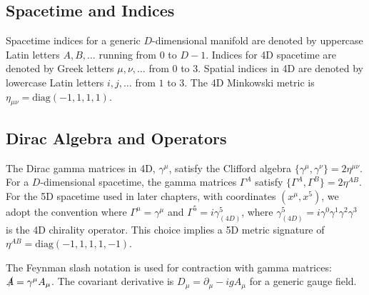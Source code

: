 \documentclass[11pt, letterpaper]{report}
\theoremstyle{plain} %
\theoremstyle{definition} %
\theoremstyle{remark} %
\begin{document}
\subsection{Spacetime and Indices}
Spacetime indices for a generic $D$-dimensional manifold are denoted by uppercase Latin letters $A, B, \dots$ running from $0$ to $D-1$. Indices for 4D spacetime are denoted by Greek letters $\mu, \nu, \dots$ from $0$ to $3$. Spatial indices in 4D are denoted by lowercase Latin letters $i, j, \dots$ from $1$ to $3$. The 4D Minkowski metric is $\eta_{\mu\nu} = \text{diag}(-1,1,1,1)$.

\subsection{Dirac Algebra and Operators}
The Dirac gamma matrices in 4D, $\gamma^\mu$, satisfy the Clifford algebra $\{\gamma^\mu, \gamma^\nu\} = 2\eta^{\mu\nu}$. For a $D$-dimensional spacetime, the gamma matrices $\Gamma^A$ satisfy $\{\Gamma^A, \Gamma^B\} = 2\eta^{AB}$. For the 5D spacetime used in later chapters, with coordinates $(x^\mu, x^5)$, we adopt the convention where $\Gamma^\mu = \gamma^\mu$ and $\Gamma^5 = i\gamma^5_{(4D)}$, where $\gamma^5_{(4D)} = i\gamma^0\gamma^1\gamma^2\gamma^3$ is the 4D chirality operator. This choice implies a 5D metric signature of $\eta^{AB} = \text{diag}(-1,1,1,1,-1)$.

The Feynman slash notation is used for contraction with gamma matrices: $\slashed{A} = \gamma^\mu A_\mu$. The covariant derivative is $D_\mu = \partial_\mu - igA_\mu$ for a generic gauge field.
\end{document}
